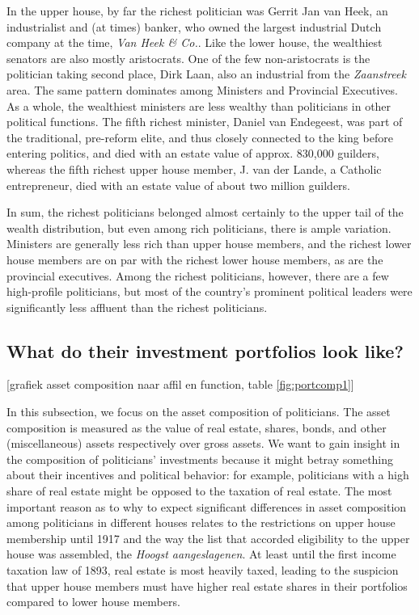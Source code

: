     In the upper house, by far the richest politician was Gerrit Jan van Heek, an industrialist and (at times) banker, who owned the largest industrial Dutch company at the time, \textit{Van Heek \& Co.}. Like the lower house, the wealthiest senators are also mostly aristocrats. One of the few non-aristocrats is the politician taking second place, Dirk Laan, also an industrial from the \textit{Zaanstreek} area. The same pattern dominates among Ministers and Provincial Executives. As a whole, the wealthiest ministers are less wealthy than politicians in other political functions. The fifth richest minister, Daniel van Endegeest, was part of the traditional, pre-reform elite, and thus closely connected to the king before entering politics, and died with an estate value of approx. 830,000 guilders, whereas the fifth richest upper house member, J. van der Lande, a Catholic entrepreneur, died with an estate value of about two million guilders. 
    
    In sum, the richest politicians belonged almost certainly to the upper tail of the wealth distribution, but even among rich politicians, there is ample variation. Ministers are generally less rich than upper house members, and the richest lower house members are on par with the richest lower house members, as are the provincial executives. Among the richest politicians, however, there are a few high-profile politicians, but most of the country's prominent political leaders were significantly less affluent than the richest politicians. 

\subsection{What do their investment portfolios look like?}

\begin{center}    
    [grafiek asset composition naar affil en function, table \ref{fig:portcomp1}]
    
\end{center}
    
    In this subsection, we focus on the asset composition of politicians. The asset composition is measured as the value of real estate, shares, bonds, and other (miscellaneous) assets respectively over gross assets. We want to gain insight in the composition of politicians' investments because it might betray something about their incentives and political behavior: for example, politicians with a high share of real estate might be opposed to the taxation of real estate. The most important reason as to why to expect significant differences in asset composition among politicians in different houses relates to the restrictions on upper house membership until 1917 and the way the list that accorded eligibility to the upper house was assembled, the \textit{Hoogst aangeslagenen}. At least until the first income taxation law of 1893, real estate is most heavily taxed, leading to the suspicion that upper house members must have higher real estate shares in their portfolios compared to lower house members. 
    
